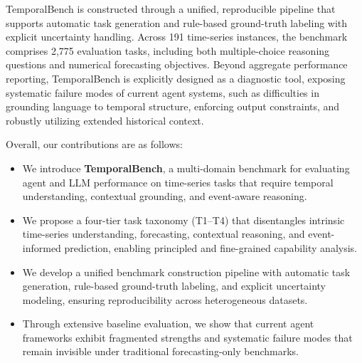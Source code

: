 TemporalBench is constructed through a unified, reproducible pipeline that supports automatic task generation and rule-based ground-truth labeling with explicit uncertainty handling. Across 191 time-series instances, the benchmark comprises 2,775 evaluation tasks, including both multiple-choice reasoning questions and numerical forecasting objectives. Beyond aggregate performance reporting, TemporalBench is explicitly designed as a diagnostic tool, exposing systematic failure modes of current agent systems, such as difficulties in grounding language to temporal structure, enforcing output constraints, and robustly utilizing extended historical context.

Overall, our contributions are as follows:
\begin{itemize}
\item We introduce \textbf{TemporalBench}, a multi-domain benchmark for evaluating agent and LLM performance on time-series tasks that require temporal understanding, contextual grounding, and event-aware reasoning.
\item We propose a four-tier task taxonomy (T1--T4) that disentangles intrinsic time-series understanding, forecasting, contextual reasoning, and event-informed prediction, enabling principled and fine-grained capability analysis.
\item We develop a unified benchmark construction pipeline with automatic task generation, rule-based ground-truth labeling, and explicit uncertainty modeling, ensuring reproducibility across heterogeneous datasets.
\item Through extensive baseline evaluation, we show that current agent frameworks exhibit fragmented strengths and systematic failure modes that remain invisible under traditional forecasting-only benchmarks.
\end{itemize}